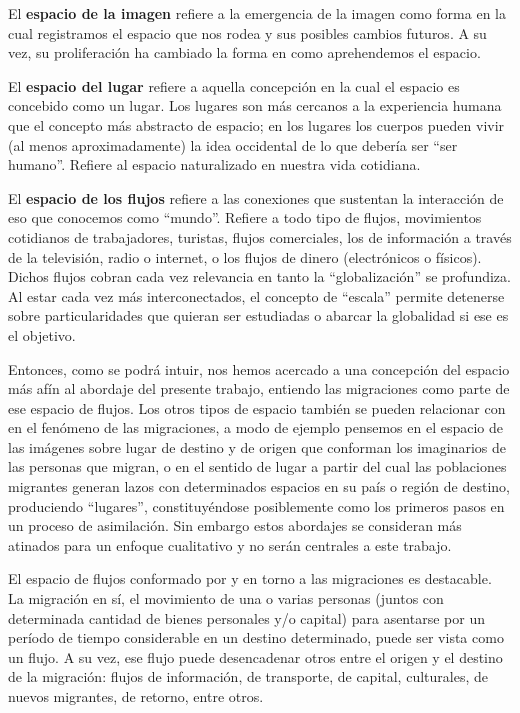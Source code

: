 \documentclass[12pt,spanish,]{article}
\begin{document}
El \textbf{espacio de la imagen} refiere a la emergencia de la imagen
como forma en la cual registramos el espacio que nos rodea y sus
posibles cambios futuros. A su vez, su proliferación ha cambiado la
forma en como aprehendemos el espacio.

El \textbf{espacio del lugar} refiere a aquella concepción en la cual el
espacio es concebido como un lugar. Los lugares son más cercanos a la
experiencia humana que el concepto más abstracto de espacio; en los
lugares los cuerpos pueden vivir (al menos aproximadamente) la idea
occidental de lo que debería ser ``ser humano''. Refiere al espacio
naturalizado en nuestra vida cotidiana.

El \textbf{espacio de los flujos} refiere a las conexiones que sustentan
la interacción de eso que conocemos como ``mundo''. Refiere a todo tipo
de flujos, movimientos cotidianos de trabajadores, turistas, flujos
comerciales, los de información a través de la televisión, radio o
internet, o los flujos de dinero (electrónicos o físicos). Dichos flujos
cobran cada vez relevancia en tanto la ``globalización'' se profundiza.
Al estar cada vez más interconectados, el concepto de ``escala'' permite
detenerse sobre particularidades que quieran ser estudiadas o abarcar la
globalidad si ese es el objetivo.

Entonces, como se podrá intuir, nos hemos acercado a una concepción del
espacio más afín al abordaje del presente trabajo, entiendo las
migraciones como parte de ese espacio de flujos. Los otros tipos de
espacio también se pueden relacionar con en el fenómeno de las
migraciones, a modo de ejemplo pensemos en el espacio de las imágenes
sobre lugar de destino y de origen que conforman los imaginarios de las
personas que migran, o en el sentido de lugar a partir del cual las
poblaciones migrantes generan lazos con determinados espacios en su país
o región de destino, produciendo ``lugares'', constituyéndose
posiblemente como los primeros pasos en un proceso de asimilación. Sin
embargo estos abordajes se consideran más atinados para un enfoque
cualitativo y no serán centrales a este trabajo.

El espacio de flujos conformado por y en torno a las migraciones es
destacable. La migración en sí, el movimiento de una o varias personas
(juntos con determinada cantidad de bienes personales y/o capital) para
asentarse por un período de tiempo considerable en un destino
determinado, puede ser vista como un flujo. A su vez, ese flujo puede
desencadenar otros entre el origen y el destino de la migración: flujos
de información, de transporte, de capital, culturales, de nuevos
migrantes, de retorno, entre otros.
\end{document}
